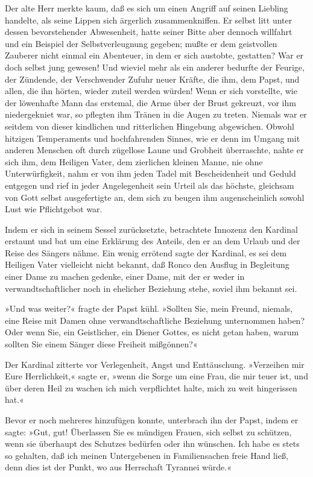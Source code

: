 Der alte Herr merkte kaum, daß es sich um einen Angriff auf seinen
Liebling handelte, als seine Lippen sich ärgerlich zusammenkniffen.
Er selbst litt unter dessen bevorstehender Abwesenheit, hatte
seiner Bitte aber dennoch willfahrt und ein Beispiel der
Selbstverleugnung gegeben; mußte er dem geistvollen Zauberer nicht
einmal ein Abenteuer, in dem er sich austobte, gestatten? War er
doch selbst jung gewesen! Und wieviel mehr als ein anderer bedurfte
der Feurige, der Zündende, der Verschwender Zufuhr neuer Kräfte,
die ihm, dem Papst, und allen, die ihn hörten, wieder zuteil werden
würden! Wenn er sich vorstellte, wie der löwenhafte Mann das
erstemal, die Arme über der Brust gekreuzt, vor ihm niedergekniet
war, so pflegten ihm Tränen in die Augen zu treten. Niemals war er
seitdem von dieser kindlichen und ritterlichen Hingebung
abgewichen. Obwohl hitzigen Temperaments und hochfahrenden Sinnes,
wie er denn im Umgang mit anderen Menschen oft durch zügellose
Laune und Grobheit überraschte, nahte er sich ihm, dem Heiligen
Vater, dem zierlichen kleinen Manne, nie ohne Unterwürfigkeit, nahm
er von ihm jeden Tadel mit Bescheidenheit und Geduld entgegen und
rief in jeder Angelegenheit sein Urteil als das höchste, gleichsam
von Gott selbst ausgefertigte an, dem sich zu beugen ihm
augenscheinlich sowohl Lust wie Pflichtgebot war.

Indem er sich in seinem Sessel zurücksetzte, betrachtete Innozenz
den Kardinal erstaunt und bat um eine Erklärung des Anteils, den er
an dem Urlaub und der Reise des \pagenum{[89]} Sängers nähme. Ein
wenig errötend sagte der Kardinal, es sei dem Heiligen Vater
vielleicht nicht bekannt, daß Ronco den Ausflug in Begleitung einer
Dame zu machen gedenke, einer Dame, mit der er weder in
verwandtschaftlicher noch in ehelicher Beziehung stehe, soviel ihm
bekannt sei.

»Und was weiter?« fragte der Papst kühl. »Sollten Sie, mein Freund,
niemals, eine Reise mit Damen ohne verwandtschaftliche Beziehung
unternommen haben? Oder wenn Sie, ein Geistlicher, ein Diener
Gottes, es nicht getan haben, warum sollten Sie einem Sänger diese
Freiheit mißgönnen?«

Der Kardinal zitterte vor Verlegenheit, Angst und Enttäuschung.
»Verzeihen mir Eure Herrlichkeit,« sagte er, »wenn die Sorge um
eine Frau, die mir teuer ist, und über deren Heil zu wachen ich
mich verpflichtet halte, mich zu weit hingerissen hat.«

Bevor er noch mehreres hinzufügen konnte, unterbrach ihn der Papst,
indem er sagte: »Gut, gut! Überlassen Sie es mündigen Frauen, sich
selbst zu schützen, wenn sie überhaupt des Schutzes bedürfen oder
ihn wünschen. Ich habe es stets so gehalten, daß ich meinen
Untergebenen in Familiensachen freie Hand ließ, denn dies ist der
Punkt, wo aus Herrschaft Tyrannei würde.«

